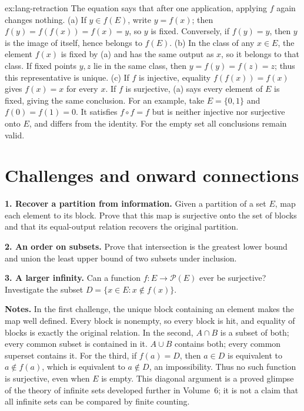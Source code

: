 \begin{solution}{ex:lang-retraction}
\idea The equation says that after one application, applying $f$ again changes nothing.
\writeup (a) If $y\in f(E)$, write $y=f(x)$; then
$f(y)=f(f(x))=f(x)=y$, so $y$ is fixed. Conversely, if $f(y)=y$, then
$y$ is the image of itself, hence belongs to $f(E)$.
(b) In the class of any $x\in E$, the element $f(x)$ is fixed by (a) and
has the same output as $x$, so it belongs to that class. If fixed points
$y,z$ lie in the same class, then $y=f(y)=f(z)=z$; thus this representative is unique.
(c) If $f$ is injective, equality $f(f(x))=f(x)$ gives $f(x)=x$ for every $x$.
If $f$ is surjective, (a) says every element of $E$ is fixed, giving the same conclusion.
For an example, take $E=\{0,1\}$ and $f(0)=f(1)=0$.
It satisfies $f\circ f=f$ but is neither injective nor surjective onto $E$,
and differs from the identity. For the empty set all conclusions remain valid.
\end{solution}

\section*{Challenges and onward connections}
\begin{challenge}
\textbf{1. Recover a partition from information.} Given a partition of a set $E$,
map each element to its block. Prove that this map is surjective onto the set of
blocks and that its equal-output relation recovers the original partition.
\par\smallskip
\textbf{2. An order on subsets.} Prove that intersection is the greatest lower
bound and union the least upper bound of two subsets under inclusion.
\par\smallskip
\textbf{3. A larger infinity.} Can a function $f:E\to\mathcal P(E)$ ever be
surjective? Investigate the subset $D=\{x\in E:x\notin f(x)\}$.
\end{challenge}

\noindent\textbf{Notes.} In the first challenge, the unique block containing an
element makes the map well defined. Every block is nonempty, so every block is
hit, and equality of blocks is exactly the original relation. In the second,
$A\cap B$ is a subset of both; every common subset is contained in it.
$A\cup B$ contains both; every common superset contains it.
For the third, if $f(a)=D$, then $a\in D$ is equivalent to $a\notin f(a)$,
which is equivalent to $a\notin D$, an impossibility. Thus no such function is
surjective, even when $E$ is empty. This diagonal argument is a proved glimpse
of the theory of infinite sets developed further in Volume~6; it is not a
claim that all infinite sets can be compared by finite counting.

